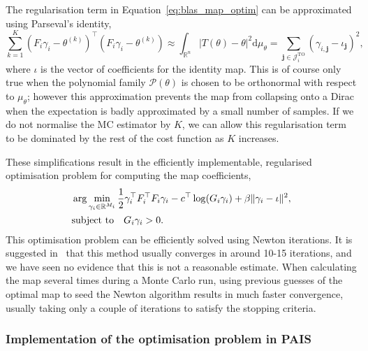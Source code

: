 \documentclass[final]{siamltex}
\begin{document}
The regularisation term in Equation~\eqref{eq:blas_map_optim} can be approximated using Parseval's identity,
\[
	\sum\limits_{k=1}^K \! (F_i\gamma_i-\theta^{(k)})^\top(F_i\gamma_i-\theta^{(k)}) \approx
		\int_{\mathbb{R}^n} |T(\theta)-\theta|^2 \text{d}\mu_\theta =
		\sum\limits_{\mathbf{j}\in\mathcal{J}_i^\text{TO}} (\gamma_{i,\mathbf{j}}-\iota_\mathbf{j})^2,
\]
where $\iota$ is the vector of coefficients for the identity map. This is of course only true when
the polynomial family $\mathcal{P}(\theta)$ is chosen to be orthonormal with respect to $\mu_\theta$; however this
approximation prevents the map from collapsing onto a Dirac when the expectation is badly approximated by a small number of samples. If we do not normalise the MC estimator by $K$, we can allow this regularisation term to be dominated by the rest of the cost function as $K$ increases.

These simplifications result in the efficiently implementable, regularised optimisation problem for
computing the map coefficients,
\begin{align}\label{eq:final_map_optim}
	&\arg\min_{\gamma_i\in\mathbb{R}^{M_i}} \frac{1}{2}\gamma_i^\top F_i^\top F_i\gamma_i -
		c^\top\log(G_i\gamma_i) + \beta\|\gamma_i-\iota\|^2, \\
	&\text{subject to} \quad G_i\gamma_i > 0. \notag
\end{align}
This optimisation problem can be efficiently solved using Newton iterations. It is suggested
in~\cite{parno2014transport} that this method usually converges in around 10-15 iterations, and we
have seen no evidence that this is not a reasonable estimate. When calculating the map several times
during a Monte Carlo run, using previous guesses of the optimal map to seed the Newton algorithm
results in much faster convergence, usually taking only a couple of iterations to satisfy the stopping
criteria.

\subsubsection{Implementation of the optimisation problem in PAIS}
\end{document}
